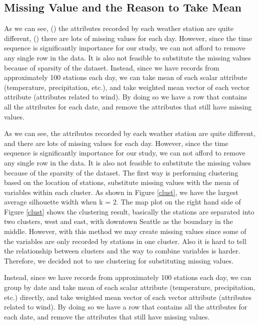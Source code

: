 \subsection{Missing Value and the Reason to Take Mean}

As we can see, (\expandafter{}) the attributes recorded by each weather station are quite different, (\expandafter{}) there are lots of missing values for each day. However, since the time sequence is significantly importance for our study, we can not afford to remove any single row in the data. It is also not feasible to substitute the missing values because of sparsity of the dataset. Instead, since we have records from approximately 100 stations each day, we can take mean of each scalar attribute (temperature, precipitation, etc.), and take weighted mean vector of each vector attribute (attributes related to wind). By doing so we have a row that contains all the attributes for each date, and remove the attributes that still have missing values.

As we can see, the attributes recorded by each weather station are quite different, and there are lots of missing values for each day. However, since the time sequence is significantly importance for our study, we can not afford to remove any single row in the data. It is also not feasible to substitute the missing values because of the sparsity of the dataset. The first way is performing clustering based on the location of stations, substitute missing values with the mean of variables within each cluster. As shown in Figure \ref{clust}, we have the largest average silhouette width when k = 2. The map plot on the right hand side of Figure \ref{clust} shows the clustering result, basically the stations are separated into two clusters, west and east, with downtown Seattle as the boundary in the middle. However, with this method we may create missing values since some of the variables are only recorded by stations in one cluster. Also it is hard to tell the relationship between clusters and the way to combine variables is harder. Therefore, we decided not to use clustering for substituting missing values.
 
Instead, since we have records from approximately 100 stations each day, we can group by date and take mean of each scalar attribute (temperature, precipitation, etc.) directly, and take weighted mean vector of each vector attribute (attributes related to wind). By doing so we have a row that contains all the attributes for each date, and remove the attributes that still have missing values.

